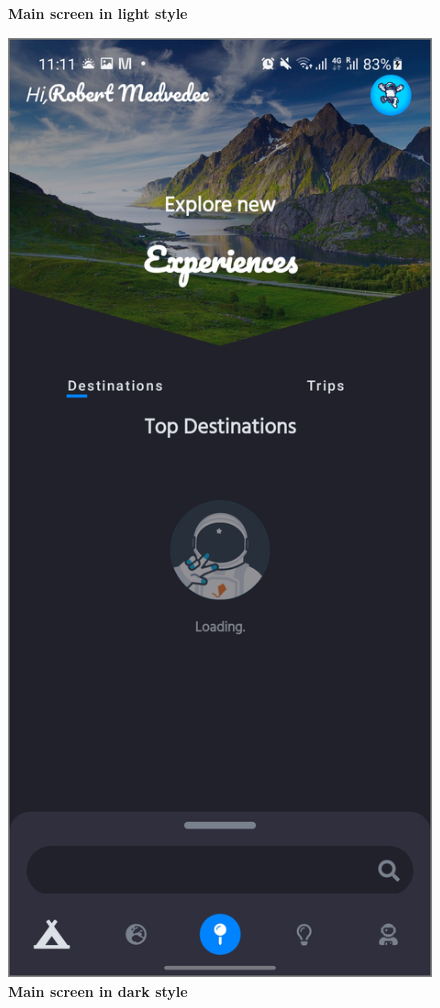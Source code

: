 \begin{figure}[!htb]
\begin{minipage}{.48\textwidth}
\caption{\label{fig:dbapiuser}\textbf{Main screen in light style}}
\end{minipage} 
\begin{minipage}{.48\textwidth}
\centering
\includegraphics[width=.9\textwidth]{../Images/UI/MainDark.jpg}
\caption{\label{fig:dbapiuser}\textbf{Main screen in dark style}}
\end{minipage}
\end{figure} 

